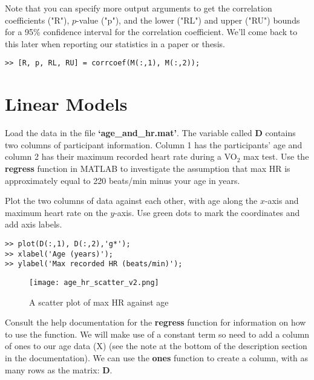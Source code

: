 \documentclass[12pt,a4paper]{article}
\begin{document}
Note that you can specify more output arguments to get the correlation coefficients ("R"), $p$-value ("p"), and the lower ("RL") and upper ("RU") bounds for a 95\% confidence interval for the correlation coefficient.
We'll come back to this later when reporting our statistics in a paper or thesis.
\begin{lstlisting}[style=Matlab-editor]
>> [R, p, RL, RU] = corrcoef(M(:,1), M(:,2));
\end{lstlisting}

\section{Linear Models}
Load the data in the file \textbf{`age\_and\_hr.mat'}.  
The variable called \textbf{D} contains two columns of participant information.  
Column 1 has the participants' age and column 2 has their maximum recorded heart rate during a VO$_{2}$ max test.  
Use the \textbf{regress} function in MATLAB to investigate the assumption that max HR is approximately equal to 220 beats/min minus your age in years.

Plot the two columns of data against each other, with age along the $x$-axis and maximum heart rate on the $y$-axis.  
Use green dots to mark the coordinates and add axis labels.
\begin{lstlisting}[style=Matlab-editor]
>> plot(D(:,1), D(:,2),'g*');
>> xlabel('Age (years)');
>> ylabel('Max recorded HR (beats/min)');
\end{lstlisting}
\begin{figure}[H]
	\begin{center}
		\texttt{[image: age\_hr\_scatter\_v2.png]}
		\caption{A scatter plot of max HR against age}
		\label{fig:agehr_scatter}
	\end{center}
\end{figure}
Consult the help documentation for the \textbf{regress} function for information on how to use the function.  
We will make use of a constant term so need to add a column of ones to our age data (X) (see the note at the bottom of the description section in the documentation).
We can use the \textbf{ones} function to create a column, with as many rows as the matrix: \textbf{D}.
\end{document}
